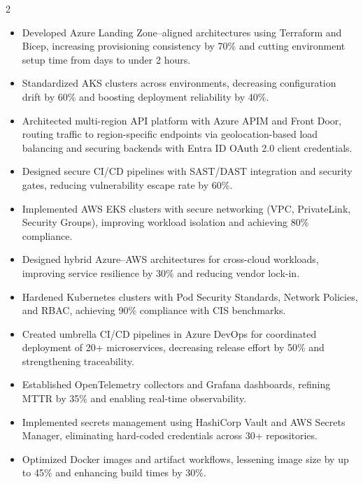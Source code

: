 \documentclass[10pt,a4paper,withhyper]{altacv}
\begin{document}
\begin{paracol}{2}

\begin{justify}
\begin{itemize}

    \item Developed Azure Landing Zone–aligned architectures using Terraform and Bicep, increasing provisioning consistency by 70\% and cutting environment setup time from days to under 2 hours.
    \item Standardized AKS clusters across environments, decreasing configuration drift by 60\% and boosting deployment reliability by 40\%.
    \item Architected multi-region API platform with Azure APIM and Front Door, routing traffic to region-specific endpoints via geolocation-based load balancing and securing backends with Entra ID OAuth 2.0 client credentials.
    \item Designed secure CI/CD pipelines with SAST/DAST integration and security gates, reducing vulnerability escape rate by 60\%.
    \item Implemented AWS EKS clusters with secure networking (VPC, PrivateLink, Security Groups), improving workload isolation and achieving 80\% compliance.
    \item Designed hybrid Azure–AWS architectures for cross-cloud workloads, improving service resilience by 30\% and reducing vendor lock-in.
    \item Hardened Kubernetes clusters with Pod Security Standards, Network Policies, and RBAC, achieving 90\% compliance with CIS benchmarks.
    \item Created umbrella CI/CD pipelines in Azure DevOps for coordinated deployment of 20+ microservices, decreasing release effort by 50\% and strengthening traceability.
    \item Established OpenTelemetry collectors and Grafana dashboards, refining MTTR by 35\% and enabling real-time observability.
    \item Implemented secrets management using HashiCorp Vault and AWS Secrets Manager, eliminating hard-coded credentials across 30+ repositories.
    \item Optimized Docker images and artifact workflows, lessening image size by up to 45\% and enhancing build times by 30\%.

\end{itemize}
\end{justify}
\end{paracol}
\end{document}
